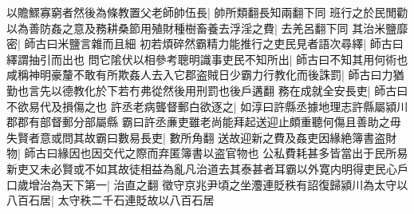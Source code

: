 以贍鰥寡窮者然後為條教置父老師帥伍長|{
	帥所類翻長知兩翻下同}
班行之於民閒勸以為善防姦之意及務耕桑節用殖財種樹畜養去浮淫之費|{
	去羌呂翻下同}
其治米鹽靡密|{
	師古曰米鹽言雜而且細}
初若煩碎然霸精力能推行之吏民見者語次尋繹|{
	師古曰繹謂抽引而出也}
問它隂伏以相參考聰明識事吏民不知所出|{
	師古曰不知其用何術也}
咸稱神明豪釐不敢有所欺姦人去入它郡盗賊日少霸力行教化而後誅罰|{
	師古曰力猶勤也言先以德教化於下若冇弗從然後用刑罰也後戶遘翻}
務在成就全安長吏|{
	師古曰不欲易代及損傷之也}
許丞老病聾督郵白欲逐之|{
	如淳曰許縣丞據地理志許縣屬潁川郡郡有部督郵分部屬縣}
霸曰許丞亷吏雖老尚能拜起送迎止頗重聽何傷且善助之毋失賢者意或問其故霸曰數易長吏|{
	數所角翻}
送故迎新之費及姦吏因緣絶簿書盗財物|{
	師古曰緣因也因交代之際而弃匿簿書以盗官物也}
公私費耗甚多皆當出于民所易新吏又未必賢或不如其故徒相益為亂凡治道去其泰甚者耳霸以外寛内明得吏民心戶口歲增治為天下第一|{
	治直之翻}
徵守京兆尹頃之坐灋連貶秩有詔復歸潁川為太守以八百石居|{
	太守秩二千石連貶故以八百石居}


